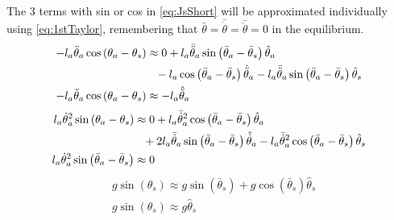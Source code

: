 The 3 terms with sin or cos in \autoref{eq:JsShort} will be approximated individually using \autoref{eq:1stTaylor}, remembering that $\bar{\theta}=\bar{\dot{\theta}}=\bar{\ddot{\theta}}=0$ in the equilibrium.
\begin{subequations}
\begin{flalign}
 -l_a\ddot{\theta}_a\cos\left(\theta_a-\theta_s\right) & \approx  0 + l_a\bar{\ddot{\theta}}_a\sin\left(\bar{\theta}_a-\bar{\theta}_s\right)\hat{\theta}_a  \notag \\ 
& \phantom{=} -l_a\cos\left(\bar{\theta}_a-\bar{\theta}_s\right)\hat{\ddot{\theta}}_a - l_a\bar{\ddot{\theta}}_a\sin\left(\bar{\theta}_a-\bar{\theta}_s\right)\hat{\theta}_s   \\
 -l_a\ddot{\theta}_a\cos\left(\theta_a-\theta_s\right) & \approx -l_a\hat{\ddot{\theta}}_a 
\end{flalign} %
\end{subequations}
\begin{subequations}
\begin{flalign}
l_a\dot{\theta}_a^2\sin\left(\theta_a-\theta_s\right) & \approx  0 + l_a\bar{\dot{\theta}}_a^2\cos\left(\bar{\theta}_a-\bar{\theta}_s\right)\hat{\theta}_a  \notag \\
& \phantom{=} + 2l_a\bar{\dot{\theta}}_a\sin\left(\bar{\theta}_a-\bar{\theta}_s\right)\hat{\dot{\theta}}_a-l_a\bar{\dot{\theta}}_a^2\cos\left(\bar{\theta}_a-\bar{\theta}_s\right)\hat{\theta}_s   \\
 l_a\dot{\theta}_a^2\sin\left(\bar{\theta}_a-\bar{\theta}_s\right) & \approx  0 
\end{flalign}
\end{subequations}
\begin{subequations}
\begin{flalign}
& g\sin\left(\theta_s\right) \approx g\sin\left(\bar{\theta}_s\right) +g\cos\left(\bar{\theta}_s\right)\hat{\theta}_s \\
& g\sin\left(\theta_s\right) \approx g\hat{\theta}_s 
\end{flalign}
\end{subequations}


